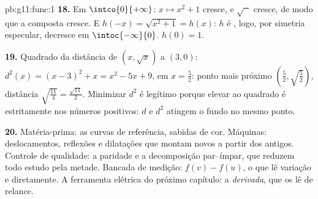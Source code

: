 \begin{solution}{pb:g11:func:1}
\textbf{18.} Em $\intco{0}{+\infty}$: $x \mapsto x^2 + 1$
cresce, e $\sqrt{\phantom{x}}$ cresce, de modo que a composta
cresce. E $h(-x) = \sqrt{x^2 + 1} = h(x)$: $h$ é , logo, por
simetria especular, decresce em $\intoc{-\infty}{0}$. 
$h(0) = 1$.

\textbf{19.} Quadrado da distância de $(x, \sqrt x)$ a
$(3, 0)$: $d^2(x) = (x - 3)^2 + x = x^2 - 5x + 9$,  em
$x = \frac52$: ponto mais próximo
$\left(\frac52, \sqrt{\frac52}\right)$, distância
$\sqrt{\frac{11}{4}} = \frac{\sqrt{11}}{2}$. Minimizar $d^2$ é
legítimo porque elevar ao quadrado é estritamente  nos
números positivos: $d$ e $d^2$ atingem o fundo no mesmo ponto.

\textbf{20.} Matéria-prima: as curvas de referência, sabidas de
cor. Máquinas: deslocamentos, reflexões e dilatações que montam
 novos a partir dos antigos. Controle de qualidade: a
paridade e a decomposição par--ímpar, que reduzem todo estudo
pela metade. Bancada de medição:  $f(v) - f(u)$, o que
lê variação e  diretamente. A ferramenta elétrica do
próximo capítulo: a \emph{derivada}, que os lê de relance.
\end{solution}
